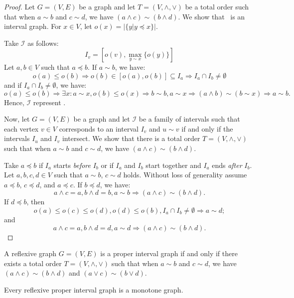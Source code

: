 \begin{proof}
Let \(G=(V,E)\) be a graph and let \(T=(V,\wedge,\vee)\) be a total order such that
when \(a\sim b\) and \(c \sim d\), we have \((a \wedge c) \sim (b \wedge d)\)\@.
We show that \mG\ is an interval graph. For \(x\in V\), let \(o(x) = |\{y| y\preceq x\}|\)\@.

Take \(\mathcal{I}\) as follows:
\[I_v = [o(v), \max_{y\sim x}\{o(y)\}]\]
Let \(a, b\in V\) such that \(a \preceq b\)\@. If \(a\sim b\), we have:
\[o(a) \le o(b) \Rightarrow o(b) \in [o(a), o(b)] \subseteq I_a \Rightarrow I_a \cap I_b \neq \emptyset\]
and if \(I_a \cap I_b \neq \emptyset\), we have:
\[o(a) \le o(b) \Rightarrow \exists x: a \sim x, o(b) \le o(x) \Rightarrow b\sim b, a\sim x \Rightarrow (a \wedge b) \sim (b \sim x) \Rightarrow a \sim b.\]
Hence, \(\mathcal{I}\) represent \mG\@.

Now, let \(G=(V,E)\) be a graph and let \(\mathcal{I}\) be a family of intervals such that
each vertex \(v \in V\) corresponds to an interval \(I_v\) and \(u \sim v\)
if and only if the intervals \(I_u\) and \(I_v\) intersect. We show that there is a
total order \(T=(V,\wedge,\vee)\) such that
when \(a\sim b\) and \(c \sim d\), we have \((a \wedge c) \sim (b \wedge d)\)\@.

Take \(a\preceq b\) if \(I_a\) starts \emph{before} \(I_b\) or if \(I_a\) and \(I_b\)
start together and \(I_a\) ends \emph{after} \(I_b\)\@. 
Let \(a,b,c,d \in V\) such that \(a \sim b\), \(c \sim d\) holds.
Without loss of generality assume \(a \preceq b\), \(c \preceq d\), and \(a \preceq c\)\@. 
If \(b \preceq d\), we have:
\[a \wedge c = a, b \wedge d = b, a \sim b \Rightarrow  (a \wedge c) \sim (b \wedge d).\]
If \(d \preceq b\), then 
\[o(a) \le o(c) \le o(d), o(d) \le o(b), I_a \cap I_b \neq \emptyset \Rightarrow a\sim d;\]
and 
\[a \wedge c = a, b \wedge d = d, a\sim d \Rightarrow (a \wedge c) \sim (b \wedge d).\]

\end{proof}

\begin{theorem}  \label{thm:minmax}
A reflexive graph \(G=(V,E)\) is a proper interval graph if and only if there exists
a total order \(T=(V,\wedge,\vee)\) such that
when \(a\sim b\) and \(c \sim d\), we have \((a \wedge c) \sim (b \wedge d)\) and \((a \vee c) \sim (b \vee d)\)\@.
\end{theorem}

\begin{cor} \label{cor:pintmon}
Every reflexive proper interval graph is a monotone graph.
\end{cor}

